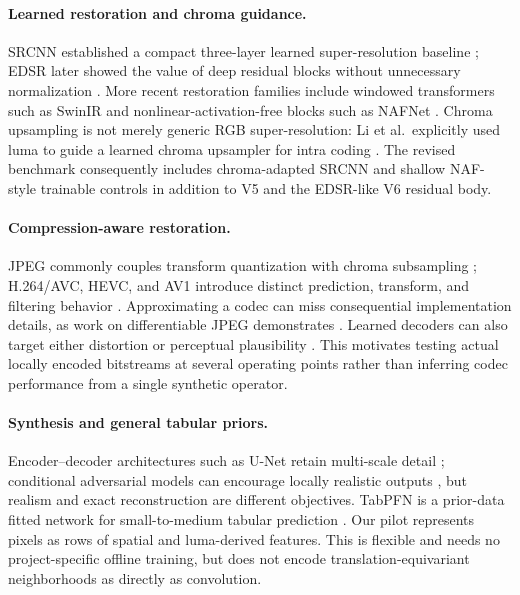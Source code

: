 \documentclass[10pt,twocolumn]{article}
\begin{document}
\paragraph{Learned restoration and chroma guidance.}
SRCNN established a compact three-layer learned super-resolution baseline
\cite{dong2014srcnn}; EDSR later showed the value of deep residual blocks without
unnecessary normalization \cite{lim2017edsr}.  More recent restoration families
include windowed transformers such as SwinIR \cite{liang2021swinir} and
nonlinear-activation-free blocks such as NAFNet \cite{chen2022nafnet}.  Chroma
upsampling is not merely generic RGB super-resolution: Li et al.\ explicitly
used luma to guide a learned chroma upsampler for intra coding
\cite{li2017chroma}.  The revised benchmark consequently includes
chroma-adapted SRCNN and shallow NAF-style trainable controls in addition to V5
and the EDSR-like V6 residual body.

\paragraph{Compression-aware restoration.}
JPEG commonly couples transform quantization with chroma subsampling
\cite{wallace1991jpeg}; H.264/AVC, HEVC, and AV1 introduce distinct prediction,
transform, and filtering behavior \cite{wiegand2003h264,sullivan2012hevc,han2021av1}.
Approximating a codec can miss consequential implementation details, as work on
differentiable JPEG demonstrates \cite{reich2024diffjpeg}.  Learned decoders can
also target either distortion or perceptual plausibility
\cite{bahat2021explorable}.  This motivates testing actual locally encoded
bitstreams at several operating points rather than inferring codec performance
from a single synthetic operator.

\paragraph{Synthesis and general tabular priors.}
Encoder--decoder architectures such as U-Net retain multi-scale detail
\cite{ronneberger2015unet}; conditional adversarial models can encourage locally
realistic outputs \cite{isola2017pix2pix}, but realism and exact reconstruction
are different objectives.  TabPFN is a prior-data fitted network for
small-to-medium tabular prediction \cite{hollmann2025tabpfn}.  Our pilot
represents pixels as rows of spatial and luma-derived features.  This is
flexible and needs no project-specific offline training, but does not encode
translation-equivariant neighborhoods as directly as convolution.
\end{document}
